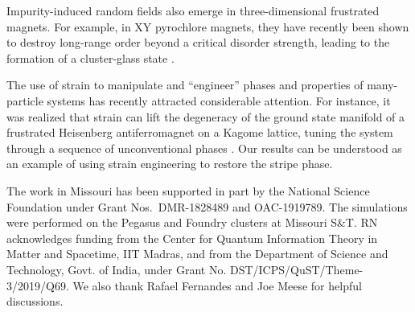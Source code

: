 \documentclass[twocolumn,showpacs,superscriptaddress,aps,prb]{revtex4-2}
\begin{document}
Impurity-induced random fields also emerge in three-dimensional frustrated magnets. For example,
in XY pyrochlore magnets, they have recently been shown to destroy long-range order beyond a
critical disorder strength,  leading to the formation of a cluster-glass state \cite{AndradeHoyosRachelVojta18}.

The use of strain to manipulate and ``engineer'' phases and properties of many-particle systems has recently
attracted considerable attention. For instance, it was realized that strain can lift
the degeneracy of the ground state manifold of a frustrated Heisenberg antiferromagnet on a Kagome lattice,
tuning the system through a sequence of unconventional phases \cite{NaygaVojtaM21}. Our results can
be understood as an example of using strain engineering to restore the stripe phase.



\acknowledgments

The work in Missouri has been supported in part by the National Science Foundation under Grant Nos.\  DMR-1828489 and
OAC-1919789. The simulations were performed on the Pegasus and Foundry clusters at Missouri S\&T.
RN acknowledges funding from the Center for Quantum Information Theory in Matter and Spacetime, IIT Madras,
and from the Department of Science and Technology, Govt. of India, under Grant No. DST/ICPS/QuST/Theme-3/2019/Q69.
We also thank Rafael Fernandes and Joe Meese for helpful discussions.




\end{document}

